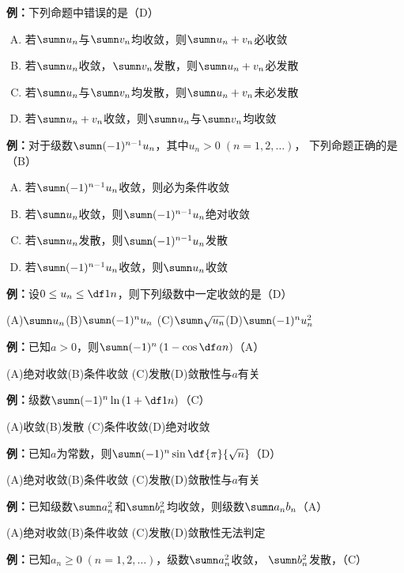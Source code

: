 {\bf 例：}下列命题中错误的是（D）
\begin{enumerate}[(A)]
  \setlength{\itemindent}{1cm}
  \item 若$\sumn u_n$与$\sumn v_n$均收敛，则$\sumn u_n+v_n$必收敛
  \item 若$\sumn u_n$收敛，$\sumn v_n$发散，则$\sumn u_n+v_n$必发散
  \item 若$\sumn u_n$与$\sumn v_n$均发散，则$\sumn u_n+v_n$未必发散
  \item 若$\sumn u_n+v_n$收敛，则$\sumn u_n$与$\sumn v_n$均收敛
\end{enumerate}


{\bf 例：}对于级数$\sumn(-1)^{n-1}u_n$，其中$u_n>0\;(n=1,2,\ldots)$，
下列命题正确的是（B）
\begin{enumerate}[(A)]
  \setlength{\itemindent}{1cm}
  \item 若$\sumn(-1)^{n-1}u_n$收敛，则必为条件收敛
  \item 若$\sumn u_n$收敛，则$\sumn(-1)^{n-1}u_n$绝对收敛
  \item 若$\sumn u_n$发散，则$\sumn(-1)^{n-1}u_n$发散
  \item 若$\sumn (-1)^{n-1} u_n$收敛，则$\sumn u_n$收敛
\end{enumerate}

{\bf 例：}设$0\leq u_n\leq \df1n$，则下列级数中一定收敛的是（D）

\quad (A)\;$\sumn u_n$\quad(B)\;$\sumn (-1)^n u_n$
\quad (C)\;$\sumn \sqrt{u_n}$\quad(D)\;$\sumn (-1)^nu_n^2$

{\bf 例：}已知$a>0$，则$\sumn(-1)^n\left(1-\cos\df an\right)$（A）

\quad (A)\;绝对收敛\quad(B)\;条件收敛
\quad (C)\;发散\quad(D)\;敛散性与$a$有关

{\bf 例：}级数$\sumn(-1)^n\ln\left(1+\df1n\right)$（C）

\quad (A)\;收敛\quad(B)\;发散
\quad (C)\;条件收敛\quad(D)\;绝对收敛

{\bf 例：}已知$a$为常数，则$\sumn(-1)^n\sin\df{\pi}{\sqrt n}$（D）

\quad (A)\;绝对收敛\quad(B)\;条件收敛
\quad (C)\;发散\quad(D)\;敛散性与$a$有关

{\bf 例：}已知级数$\sumn a_n^2$和$\sumn b_n^2$均收敛，则级数$\sumn a_nb_n$（A）

\quad (A)\;绝对收敛\quad(B)\;条件收敛
\quad (C)\;发散\quad(D)\;敛散性无法判定

{\bf 例：}已知$a_n\geq 0\;(n=1,2,\ldots)$，级数$\sumn a_n^2$收敛，
$\sumn b_n^2$发散，（C） 

